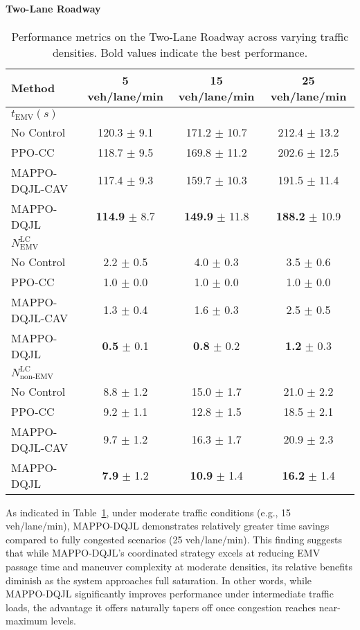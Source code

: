 \paragraph{Two-Lane Roadway}
\begin{table}[htbp]
\centering
\begin{tabular}{lccc}
\toprule
\textbf{Method} & \textbf{5 veh/lane/min} & \textbf{15 veh/lane/min} & \textbf{25 veh/lane/min} \\
\midrule
\textbf{\textit{$t_{\text{EMV}} (s)$}} & & & \\ 
No Control & 120.3 $\pm$ 9.1 & 171.2 $\pm$ 10.7 & 212.4 $\pm$ 13.2 \\
PPO-CC~\cite{suo2024model} & 118.7 $\pm$ 9.5 & 169.8 $\pm$ 11.2 & 202.6 $\pm$ 12.5 \\
MAPPO-DQJL-CAV & 117.4 $\pm$ 9.3 & 159.7 $\pm$ 10.3 & 191.5 $\pm$ 11.4 \\
MAPPO-DQJL & \textbf{114.9} $\pm$ 8.7 & \textbf{149.9} $\pm$ 11.8 & \textbf{188.2} $\pm$ 10.9 \\
\midrule
\textbf{\textit{\boldmath$N_{\text{EMV}}^{\text{LC}}$}} & & & \\ 
No Control & 2.2 $\pm$ 0.5 & 4.0 $\pm$ 0.3 & 3.5 $\pm$ 0.6 \\
PPO-CC~\cite{suo2024model} & 1.0 $\pm$ 0.0 & 1.0 $\pm$ 0.0 & 1.0 $\pm$ 0.0 \\
MAPPO-DQJL-CAV & 1.3 $\pm$ 0.4 & 1.6 $\pm$ 0.3 & 2.5 $\pm$ 0.5 \\
MAPPO-DQJL & \textbf{0.5} $\pm$ 0.1 & \textbf{0.8} $\pm$ 0.2 & \textbf{1.2} $\pm$ 0.3 \\
\midrule
\textbf{\textit{\boldmath$N_{\text{non-EMV}}^{\text{LC}}$}} & & & \\ 
No Control & 8.8 $\pm$ 1.2 & 15.0 $\pm$ 1.7 & 21.0 $\pm$ 2.2 \\
PPO-CC~\cite{suo2024model} & 9.2 $\pm$ 1.1 & 12.8 $\pm$ 1.5 & 18.5 $\pm$ 2.1 \\
MAPPO-DQJL-CAV & 9.7 $\pm$ 1.2 & 16.3 $\pm$ 1.7 & 20.9 $\pm$ 2.3 \\
MAPPO-DQJL & \textbf{7.9} $\pm$ 1.2 & \textbf{10.9} $\pm$ 1.4 & \textbf{16.2} $\pm$ 1.4 \\
\bottomrule
\end{tabular}
\caption{Performance metrics on the Two-Lane Roadway across varying traffic densities. Bold values indicate the best performance.}
\label{tab:density_two_lane}
\end{table}
As indicated in Table~\ref{tab:density_two_lane}, under moderate traffic conditions (e.g., 15 veh/lane/min), MAPPO-DQJL demonstrates relatively greater time savings compared to fully congested scenarios (25 veh/lane/min). This finding suggests that while MAPPO-DQJL’s coordinated strategy excels at reducing EMV passage time and maneuver complexity at moderate densities, its relative benefits diminish as the system approaches full saturation. In other words, while MAPPO-DQJL significantly improves performance under intermediate traffic loads, the advantage it offers naturally tapers off once congestion reaches near-maximum levels.

